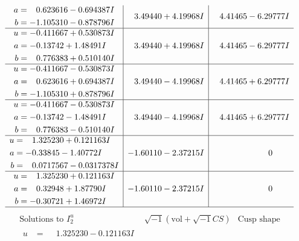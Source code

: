 \documentclass[1p]{elsarticle_modified}
\theoremstyle{definition}
\newcommand{\I}{\sqrt{-1}}
\begin{document}
$$\begin{array}{c|c|c}
\begin{aligned}
a &= \phantom{-}0.623616 - 0.694387 I \\
b &= -1.105310 - 0.878796 I\end{aligned}
 & \phantom{-}3.49440 + 4.19968 I & \phantom{-}4.41465 - 6.29777 I \\ \hline\begin{aligned}
u &= -0.411667 + 0.530873 I \\
a &= -0.13742 + 1.48491 I \\
b &= \phantom{-}0.776383 + 0.510140 I\end{aligned}
 & \phantom{-}3.49440 + 4.19968 I & \phantom{-}4.41465 - 6.29777 I \\ \hline\begin{aligned}
u &= -0.411667 - 0.530873 I \\
a &= \phantom{-}0.623616 + 0.694387 I \\
b &= -1.105310 + 0.878796 I\end{aligned}
 & \phantom{-}3.49440 - 4.19968 I & \phantom{-}4.41465 + 6.29777 I \\ \hline\begin{aligned}
u &= -0.411667 - 0.530873 I \\
a &= -0.13742 - 1.48491 I \\
b &= \phantom{-}0.776383 - 0.510140 I\end{aligned}
 & \phantom{-}3.49440 - 4.19968 I & \phantom{-}4.41465 + 6.29777 I \\ \hline\begin{aligned}
u &= \phantom{-}1.325230 + 0.121163 I \\
a &= -0.33845 - 1.40772 I \\
b &= \phantom{-}0.0717567 - 0.0317378 I\end{aligned}
 & -1.60110 - 2.37215 I & \phantom{-0.000000 } 0 \\ \hline\begin{aligned}
u &= \phantom{-}1.325230 + 0.121163 I \\
a &= \phantom{-}0.32948 + 1.87790 I \\
b &= -0.30721 + 1.46972 I\end{aligned}
 & -1.60110 - 2.37215 I & \phantom{-0.000000 } 0\\
 \hline 
 \end{array}$$\newpage$$\begin{array}{c|c|c}  
\text{Solutions to }I^u_{2}& \I (\text{vol} + \sqrt{-1}CS) & \text{Cusp shape}\\
 \hline 
\begin{aligned}
u &= \phantom{-}1.325230 - 0.121163 I \\

\end{aligned}
\end{array}$$
\end{document}
